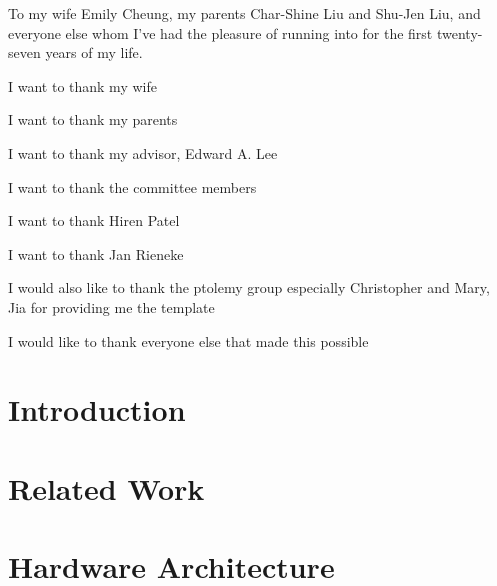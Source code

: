 \documentclass[11pt]{ucthesis}
\begin{document}
\begin{frontmatter}

\begin{dedication}
\null\vfil
{\large
\begin{center}
To my wife Emily Cheung, my parents Char-Shine Liu and Shu-Jen Liu, and everyone else whom
I've had the pleasure of running into for the first twenty-seven years of my
life.
\end{center}}
\vfil\null
\end{dedication}

\tableofcontents
\listoffigures
\listoftables
\begin{acknowledgements}

I want to thank my wife

I want to thank my parents

I want to thank my advisor, Edward A. Lee

I want to thank the committee members

I want to thank Hiren Patel

I want to thank Jan Rieneke

I would also like to thank the ptolemy group especially Christopher and Mary, Jia for providing me the template

I would like to thank everyone else that made this possible

\end{acknowledgements}

\end{frontmatter}

\chapter{Introduction}
\label{chapter:intro}


\chapter{Related Work}
\label{chapter:related}


\chapter{Hardware Architecture}
\label{chapter:pret}

\end{document}
